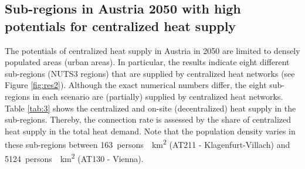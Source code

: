 \subsection{Sub-regions in Austria 2050 with high potentials for centralized heat supply}\label{res:3}
The potentials of centralized heat supply in Austria in 2050 are limited to densely populated areas (urban areas). In particular, the results indicate eight different sub-regions (NUTS3 regions) that are supplied by centralized heat networks (see Figure \ref{fig:res2}). Although the exact numerical numbers differ, the eight sub-regions in each scenario are (partially) supplied by centralized heat networks. Table \ref{tab:3} shows the centralized and on-site (decentralized) heat supply in the sub-regions. Thereby, the connection rate is assessed by the share of centralized heat supply in the total heat demand. Note that the population density varies in these sub-regions between \SI{163}{persons \per \kilo\metre^2} (AT211 - Klagenfurt-Villach) and \SI{5124}{persons \per \kilo\metre^2} (AT130 - Vienna).

